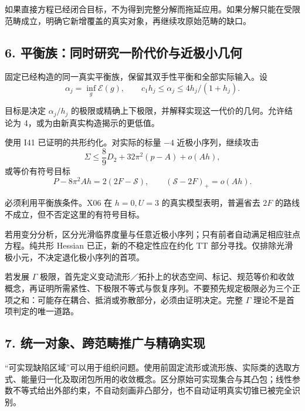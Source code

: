 \documentclass[
  10pt,
]{article}
\begin{document}
如果直接方程已经闭合目标，不为得到完整分解而拖延应用。如果分解只能在受限范畴成立，明确它新增覆盖的真实对象，再继续攻原始范畴的缺口。

\hypertarget{ux5e73ux8861ux65cfux540cux65f6ux7814ux7a76ux4e00ux9636ux4ee3ux4ef7ux4e0eux8fd1ux6781ux5c0fux51e0ux4f55}{%
\subsection{6.
平衡族：同时研究一阶代价与近极小几何}\label{ux5e73ux8861ux65cfux540cux65f6ux7814ux7a76ux4e00ux9636ux4ee3ux4ef7ux4e0eux8fd1ux6781ux5c0fux51e0ux4f55}}

固定已经构造的同一真实平衡族，保留其双手性平衡和全部实际输入。设 \[
\alpha_j=\inf_g\mathcal E(g),\qquad
c_1h_j\le\alpha_j\le4h_j/(1+h_j).
\]

目标是决定 \(\alpha_j/h_j\)
的极限或精确上下极限，并解释实现这一代价的几何。允许结论为
4，或为由新真实构造揭示的更低值。

使用 I41 已证明的共形约化。对实际的标量 \(-4\) 近极小序列，继续攻击 \[
\Sigma\le\frac89D_2+32\pi^2(p-A)+o(Ah),
\] 或等价有符号目标 \[
P-8\pi^2Ah=2(2F-\mathscr S),\qquad
\boxed{(\mathscr S-2F)_+=o(Ah).}
\]

必须利用平衡族条件。X06 在 \(h=0,U=3\) 的真实模型表明，普遍省去 \(2F\)
的路线不成立，但不否定这里的有符号目标。

若用变分分析，区分光滑临界度量与任意近极小序列；只有前者自动满足相应驻点方程。纯共形
Hessian 已正，新的不稳定性应在约化 TT
部分寻找。仅排除光滑极小元，不决定退化极小序列的首项。

若发展 \(\Gamma\)
极限，首先定义变动流形／拓扑上的状态空间、标记、规范等价和收敛概念，再证明所需紧性、下极限不等式与恢复序列。不要预先规定极限必为三个正项之和：可能存在耦合、抵消或弥散部分，必须由证明决定。完整
\(\Gamma\) 理论不是首项判定的唯一道路。

\hypertarget{ux7edfux4e00ux5bf9ux8c61ux8de8ux8303ux7574ux63a8ux5e7fux4e0eux7cbeux786eux5b9eux73b0}{%
\subsection{7.
统一对象、跨范畴推广与精确实现}\label{ux7edfux4e00ux5bf9ux8c61ux8de8ux8303ux7574ux63a8ux5e7fux4e0eux7cbeux786eux5b9eux73b0}}

``可实现缺陷区域''可以用于组织问题。使用前固定流形或流形族、实际类的选取方式、能量归一化及取闭包所用的收敛概念。区分原始可实现集合与其凸包；线性参数不等式给出外部约束，不自动刻画非凸部分，也不自动证明真实切锥已被完全识别。
\end{document}
